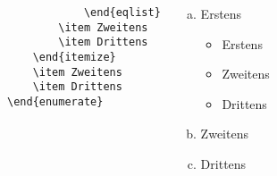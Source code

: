 \begin{frame}[fragile]
\begin{columns}
\begin{lstlisting}
			\end{eqlist}
		\item Zweitens
		\item Drittens 
	\end{itemize}
	\item Zweitens
	\item Drittens 
\end{enumerate}
		\end{lstlisting}
		\begin{outputbox}
\begin{enumerate}[(a)]
	\item Erstens
	\begin{itemize}
		\item Erstens
		\item Zweitens
		\item Drittens 
	\end{itemize}
	\item Zweitens
	\item Drittens 
\end{enumerate}
		\end{outputbox}			
\end{columns}
\end{frame}
